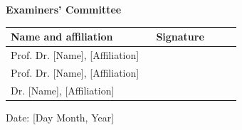 \cleardoublepage
\thispagestyle{empty}

\begin{center}\huge \textbf{Examiners' Committee}\end{center}

\vspace{2em}

\begin{tabular}{p{0.6\linewidth} p{0.35\linewidth}}
\textbf{Name and affiliation} & \textbf{Signature} \\
\hline
Prof. Dr. [Name], [Affiliation] & \dotfill \\
Prof. Dr. [Name], [Affiliation] & \dotfill \\
Dr. [Name], [Affiliation] & \dotfill \\
\end{tabular}

\vfill
\begin{flushright}
\large Date: [Day Month, Year]
\end{flushright}
